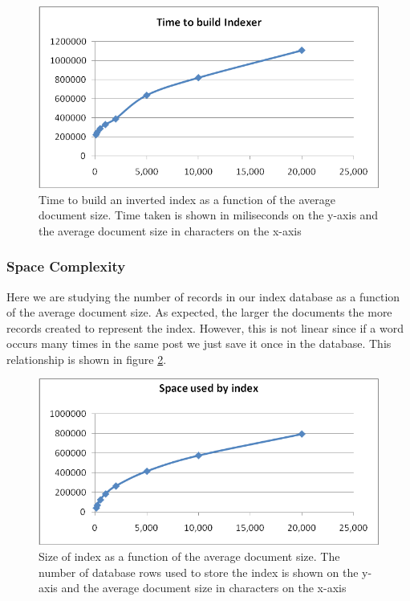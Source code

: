 \documentclass[10pt]{report}
\begin{document}
\begin{itemize}
  \begin{figure}
    \begin{center}
      \includegraphics[width=\textwidth,height=!]{docsizetimecomplexbuildindex}
    \end{center}
    \caption{Time to build an inverted index as a function of the
      average document size. Time taken is shown in miliseconds on the
      y-axis and the average document size in characters on the x-axis} 
    \label{fig:docsizetimecomplexbuildindex}
  \end{figure} 

\end{itemize}


\subsubsection{Space Complexity}
Here we are studying the number of records in our index database as a
function of the average document size. As expected, the larger the documents
the more records created to represent the index. However, this is not linear
since if a word occurs many times in the same post we just save it
once in the database. This relationship is shown in figure
\ref{fig:docsizespacecomplexbuildindex}. 

\begin{figure}
  \begin{center}
    \includegraphics[width=\textwidth,height=!]{docsizespacecomplexbuildindex}
  \end{center}
  \caption{Size of index as a function of the average document
    size. The number of database rows used to store the index is
      shown on the y-axis and the average document size in characters
      on the x-axis}  
  \label{fig:docsizespacecomplexbuildindex}
\end{figure} 
\end{document}
